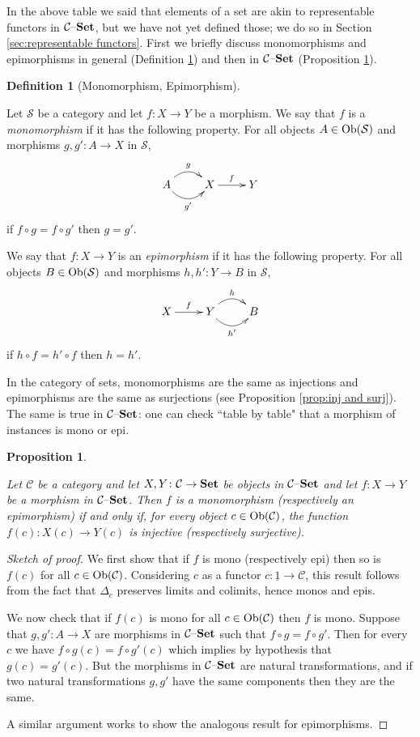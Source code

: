 \documentclass{book}
\def\tn{\textnormal}
\def\mc{\mathcal}
\def\Ob{\tn{Ob}}
\def\to{\rightarrow}
\def\taking{\colon}
\def\ul{\underline}
\def\Set{{\bf Set}}
\def\set{{\text \textendash}{\bf Set}}
\def\mcC{\mc{C}}
\def\mcS{\mc{S}}
\newtheorem{proposition}[subsubsection]{Proposition}
\theoremstyle{remark}
\theoremstyle{definition}
\newtheorem{definition}[subsubsection]{Definition}
\begin{document}
In the above table we said that elements of a set are akin to representable functors in $\mcC\set$, but we have not yet defined those; we do so in Section \ref{sec:representable functors}. First we briefly discuss monomorphisms and epimorphisms in general (Definition \ref{def:mono, epi}) and then in $\mcC\set$ (Proposition \ref{prop:epi mono in c-set}). 

\begin{definition}[Monomorphism, Epimorphism]\label{def:mono, epi}

Let $\mcS$ be a category and let $f\taking X\to Y$ be a morphism. We say that $f$ is a {\em monomorphism} if it has the following property. For all objects $A\in\Ob(\mcS)$ and morphisms $g,g'\taking A\to X$ in $\mcS$, 
$$
\xymatrix{A\ar@/^1pc/[r]^g\ar@/_1pc/[r]_{g'}&X\ar[r]^f&Y}
$$
if $f\circ g=f\circ g'$ then $g=g'$.

We say that $f\taking X\to Y$ is an {\em epimorphism} if it has the following property. For all objects $B\in\Ob(\mcS)$ and morphisms $h,h'\taking Y\to B$ in $\mcS$,
$$
\xymatrix{X\ar[r]^f&Y\ar@/^1pc/[r]^h\ar@/_1pc/[r]_{h'}&B}
$$
if $h\circ f=h'\circ f$ then $h=h'$.

\end{definition}

In the category of sets, monomorphisms are the same as injections and epimorphisms are the same as surjections (see Proposition \ref{prop:inj and surj}). The same is true in $\mcC\set$: one can check ``table by table" that a morphism of instances is mono or epi.

\begin{proposition}\label{prop:epi mono in c-set}

Let $\mcC$ be a category and let $X,Y\taking\mcC\to\Set$ be objects in $\mcC\set$ and let $f\taking X\to Y$ be a morphism in $\mcC\set$. Then $f$ is a monomorphism (respectively an epimorphism) if and only if, for every object $c\in\Ob(\mcC)$, the function $f(c)\taking X(c)\to Y(c)$ is injective (respectively surjective). 

\end{proposition}

\begin{proof}[Sketch of proof]

We first show that if $f$ is mono (respectively epi) then so is $f(c)$ for all $c\in\Ob(\mcC)$. Considering $c$ as a functor $c\taking\ul{1}\to\mcC$, this result follows from the fact that $\Delta_c$ preserves limits and colimits, hence monos and epis. 

We now check that if $f(c)$ is mono for all $c\in\Ob(\mcC)$ then $f$ is mono. Suppose that $g,g'\taking A\to X$ are morphisms in $\mcC\set$ such that $f\circ g=f\circ g'$. Then for every $c$ we have $f\circ g(c)=f\circ g'(c)$ which implies by hypothesis that $g(c)=g'(c)$. But the morphisms in $\mcC\set$ are natural transformations, and if two natural transformations $g,g'$ have the same components then they are the same. 

A similar argument works to show the analogous result for epimorphisms.

\end{proof}
\end{document}
